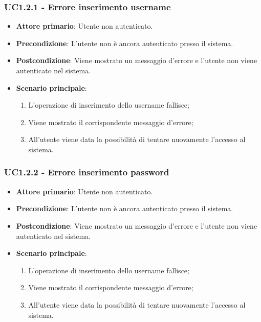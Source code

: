 \subsubsection{UC1.2.1 - Errore inserimento username}
\begin{itemize}
\item \textbf{Attore primario}: Utente non autenticato.
\item \textbf{Precondizione}: L'utente non è ancora autenticato presso il sistema.
\item \textbf{Postcondizione}: Viene mostrato un messaggio d'errore e l'utente non viene autenticato nel sistema.

\item \textbf{Scenario principale}:
\begin{enumerate}
\item L'operazione di inserimento dello username fallisce;
\item Viene mostrato il corrispondente messaggio d'errore;
\item All'utente viene data la possibilità di tentare nuovamente l'accesso al sistema.
\end{enumerate}
\end{itemize}

\subsubsection{UC1.2.2 - Errore inserimento password}
\begin{itemize}
\item \textbf{Attore primario}: Utente non autenticato.
\item \textbf{Precondizione}: L'utente non è ancora autenticato presso il sistema.
\item \textbf{Postcondizione}: Viene mostrato un messaggio d'errore e l'utente non viene autenticato nel sistema.

\item \textbf{Scenario principale}:
\begin{enumerate}
\item L'operazione di inserimento dello username fallisce;
\item Viene mostrato il corrispondente messaggio d'errore;
\item All'utente viene data la possibilità di tentare nuovamente l'accesso al sistema.
\end{enumerate}
\end{itemize}


